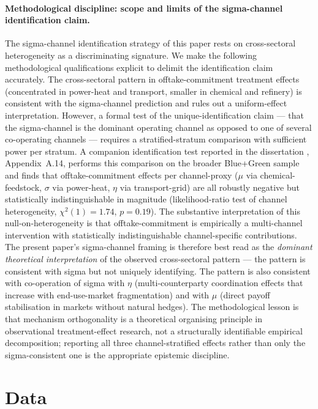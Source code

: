 \documentclass[12pt,a4paper]{article}
\theoremstyle{plain}
\theoremstyle{definition}
\begin{document}
\paragraph{Methodological discipline: scope and limits of the sigma-channel identification claim.}
The sigma-channel identification strategy of this paper rests on cross-sectoral heterogeneity as a discriminating signature. We make the following methodological qualifications explicit to delimit the identification claim accurately. The cross-sectoral pattern in offtake-commitment treatment effects (concentrated in power-heat and transport, smaller in chemical and refinery) is consistent with the sigma-channel prediction and rules out a uniform-effect interpretation. However, a formal test of the unique-identification claim --- that the sigma-channel is the dominant operating channel as opposed to one of several co-operating channels --- requires a stratified-stratum comparison with sufficient power per stratum. A companion identification test reported in the dissertation \citep{saakstra2026thesis}, Appendix~A.14, performs this comparison on the broader Blue+Green sample and finds that offtake-commitment effects per channel-proxy ($\mu$ via chemical-feedstock, $\sigma$ via power-heat, $\eta$ via transport-grid) are all robustly negative but statistically indistinguishable in magnitude (likelihood-ratio test of channel heterogeneity, $\chi^2(1) = 1.74$, $p = 0.19$). The substantive interpretation of this null-on-heterogeneity is that offtake-commitment is empirically a multi-channel intervention with statistically indistinguishable channel-specific contributions. The present paper's sigma-channel framing is therefore best read as the \emph{dominant theoretical interpretation} of the observed cross-sectoral pattern --- the pattern is consistent with sigma but not uniquely identifying. The pattern is also consistent with co-operation of sigma with $\eta$ (multi-counterparty coordination effects that increase with end-use-market fragmentation) and with $\mu$ (direct payoff stabilisation in markets without natural hedges). The methodological lesson is that mechanism orthogonality is a theoretical organising principle in observational treatment-effect research, not a structurally identifiable empirical decomposition; reporting all three channel-stratified effects rather than only the sigma-consistent one is the appropriate epistemic discipline.

\section{Data}
\label{sec:data}
\end{document}
